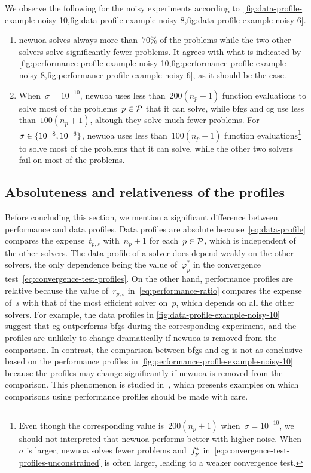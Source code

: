 We observe the following for the noisy experiments according to~\cref{fig:data-profile-example-noisy-10,fig:data-profile-example-noisy-8,fig:data-profile-example-noisy-6}.
\begin{enumerate}
    \item \Gls{newuoa} solves always more than~$70\%$ of the problems while the two other solvers solve significantly fewer problems.
    It agrees with what is indicated by \cref{fig:performance-profile-example-noisy-10,fig:performance-profile-example-noisy-8,fig:performance-profile-example-noisy-6}, as it should be the case.
    \item When~$\sigma = 10^{-10}$, \gls{newuoa} uses less than~$200 (n_p + 1)$ function evaluations to solve most of the problems~$p \in \mathcal{P}$ that it can solve, while \gls{bfgs} and \gls{cg} use less than~$100 (n_p + 1)$, altough they solve much fewer problems.
    For~$\sigma \in \{10^{-8}, 10^{-6}\}$, \gls{newuoa} uses less than~$100 (n_p + 1)$ function evaluations\footnote{Even though the corresponding value is~$200 (n_p + 1)$ when~$\sigma = 10^{-10}$, we should not interpreted that \gls{newuoa} performs better with higher noise. When~$\sigma$ is larger, \gls{newuoa} solves fewer problems and~$f_p^{\ast}$ in~\cref{eq:convergence-test-profiles-unconstrained} is often larger, leading to a weaker convergence test.} to solve most of the problems that it can solve, while the other two solvers fail on most of the problems.
\end{enumerate}

\subsection{Absoluteness and relativeness of the profiles}

Before concluding this section, we mention a significant difference between performance and data profiles.
Data profiles are absolute because~\cref{eq:data-profile} compares the expense~$t_{p, s}$ with~$n_p + 1$ for each~$p \in \mathcal{P}$, which is independent of the other solvers.
The data profile of a solver does depend weakly on the other solvers, the only dependence being the value of~$\varphi_p^{\ast}$ in the convergence test~\cref{eq:convergence-test-profiles}.
On the other hand, performance profiles are relative because the value of~$r_{p, s}$ in~\cref{eq:performance-ratio} compares the expense of~$s$ with that of the most efficient solver on~$p$, which depends on all the other solvers. 
For example, the data profiles in \cref{fig:data-profile-example-noisy-10} suggest that \gls{cg} outperforms \gls{bfgs} during the corresponding experiment, and the profiles are unlikely to change dramatically if \gls{newuoa} is removed from the comparison.
In contrast, the comparison between \gls{bfgs} and \gls{cg} is not as conclusive based on the performance profiles in \cref{fig:performance-profile-example-noisy-10} because the profiles may change significantly if \gls{newuoa} is removed from the comparison.
This phenomenon is studied in~\cite{Gould_Scott_2016}, which presents examples on which comparisons using performance profiles should be made with care.

